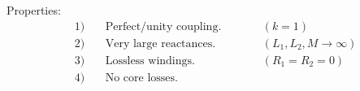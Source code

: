 \begin{multicols}{2}

    \newcommand{\MyReusableFormatting}[3]{
        \begin{circuitikz}
            \draw %
                (0,0)
                to[short, #1] ++(1,0) coordinate (L1Top)
                to[L, name=L1] ++(0,-2)
                to[short] ++(-1,0) coordinate (LeftVBottom)
                to[open, o-o] (0,0) coordinate (LeftVTop)
            ;
            \draw %
                (L1Top) ++(1,0) coordinate (L2Top)
                to[short, #2] ++(1,0) coordinate (RightVTop)
                to[open, o-o] ++(0,-2) coordinate (RightVBottom)
                to[short] ++(-1,0)
                to[L, name=L2] (L2Top)
            ;
            \path
                (LeftVTop)  -- (LeftVBottom)  node[pos=0.2] {$+$} node[pos=0.5] {$\mathbf{V}_1$} node[pos=0.8] {$-$}
                (RightVTop) -- (RightVBottom) node[pos=0.2] {$+$} node[pos=0.5] {$\mathbf{V}_2$} node[pos=0.8] {$-$}
            ;
            \path
                (L1Top) -- coordinate[midway] (GapTop) (L2Top)
            ;
            \draw
                (GapTop) ++(0,0.1) node[above] {$N_1 {:} N_2$}
            ;
            \draw
                #3
            ;
            \draw
                (1.5,-1) pic {simshadows/ee/ironcore}
            ;
        \end{circuitikz}
    }

    \begin{CheatsheetEntryFrame}





        Properties:
        \begin{alignat*}{3}
            & \text{1)} \ && \text{Perfect/unity coupling.} & \qquad %
                & (k = 1) \\
            & \text{2)} && \text{Very large reactances.} &
                & (L_1, L_2, M \to \infty) \\
            & \text{3)} && \text{Lossless windings.} &
                & (R_1 = R_2 = 0) \\
            & \text{4)} && \text{No core losses.}
        \end{alignat*}


\end{CheatsheetEntryFrame}
\end{multicols}

